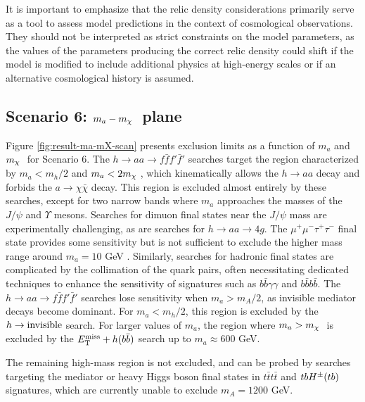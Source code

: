 It is important to emphasize that the relic density considerations primarily serve as a tool to assess \thdma model predictions in the context of cosmological observations. They should not be interpreted as strict constraints on the model parameters, as the values of the parameters producing the correct relic density could shift if the model is modified to include additional physics at high-energy scales or if an alternative cosmological history is assumed.

\subsection{Scenario 6: \texorpdfstring{$m_a -m_{\chi}~$}{TEXT} plane}

Figure \ref{fig:result-ma-mX-scan} presents exclusion limits as a function of $m_a$ and $m_{\chi}~$ for Scenario 6. The $h\rightarrow aa \rightarrow f\bar{f}f'\bar{f}'$ searches target the region characterized by $m_a<m_h/2$ and $m_a < 2m_{\chi}~$, which kinematically allows the $h\rightarrow aa$ decay and forbids the $a\rightarrow \chi\bar{\chi}$ decay. This region is excluded almost entirely by these searches, except for two narrow bands where $m_a$ approaches the masses of the $J/\psi$ and $\Upsilon$ mesons. Searches for dimuon final states near the $J/\psi$ mass are experimentally challenging, as are searches for $h\rightarrow aa\rightarrow 4g$. The $\mu^+\mu^-\tau^+\tau^-$ final state provides some sensitivity but is not sufficient to exclude the higher mass range around $m_a=10$ GeV \cite{HIGG-2014-02}. Similarly, searches for hadronic final states are complicated by the collimation of the quark pairs, often necessitating dedicated techniques to enhance the sensitivity of signatures such as $b\bar{b}\gamma\gamma$ and $b\bar{b}b\bar{b}$. The $h\rightarrow aa \rightarrow f\bar{f}f'\bar{f}'$ searches lose sensitivity when $m_a>m_A/2$, as invisible mediator decays become dominant. For $m_a < m_h/2$, this region is excluded by the $h\rightarrow \mathrm{invisible}$ search. For larger values of $m_a$, the region where $m_a>m_{\chi}~$ is excluded by the $E_{\mathrm{T}}^{\mathrm{miss}}+h(b\bar{b})$  search up to $m_a\approx 600$ GeV. 

The remaining high-mass region is not excluded, and can be probed by searches targeting the mediator or heavy Higgs boson final states in $t\bar{t}t\bar{t}$ and $tbH^{\pm}(tb)$ signatures, which are currently unable to exclude $m_A=1200$ GeV.

